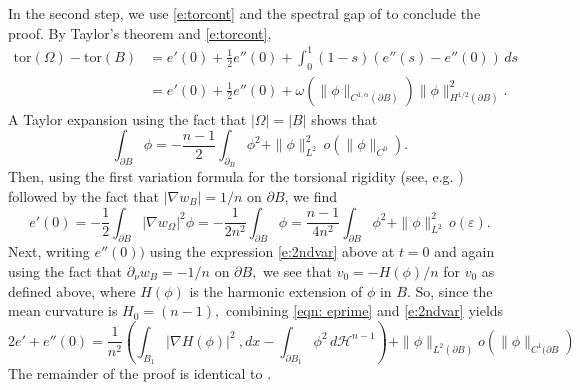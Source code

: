 \documentclass[10pt, reqno]{amsart}
\numberwithin{equation}{section}
\def\e{\varepsilon}
\def\W{\Omega}
\def\tor{\mathrm{tor}}
\def\na{\nabla}
\begin{document}
In the second step, we use \eqref{e:torcont} and the spectral gap of \cite[Theorem 3.3]{BDV15} to conclude the proof. By Taylor's theorem and \eqref{e:torcont},
\begin{align*}
 \tor(\W)-\tor(B) & = e'(0) + \frac{1}{2} e''(0) + \int_0^1 (1-s) (e''(s) - e''(0))\,ds\\
 &= e'(0) + \frac{1}{2} e''(0) + \omega(\| \phi \|_{C^{1,\alpha}(\partial B)}) \| \phi \|^2_{H^{1/2}(\partial B)}. 
\end{align*}
A Taylor expansion using the fact that $|\Omega|=|B|$ shows that 
\[
\int_{\partial B}  \phi   = - \frac{n-1}{2} \int_{\partial_B }\phi^2 + \| \phi \|_{L^2}^2\, o(\| \phi\|_{C^0}).
\]
Then, using the first variation formula for the torsional rigidity (see, e.g. \cite[Lemma 2.7]{dl19}) followed by the fact that $|\na w_B| = 1/n$ on $\partial B$, we find 
\begin{equation}
    \label{eqn: eprime}
e'(0) = -\frac{1}{2}  \int_{\partial B}  |\nabla w_\W|^2 \phi
= -\frac{1}{2n^2}  \int_{\partial B}  \phi = \frac{n-1}{4n^2} \int_{\partial B} \phi^2  + \| \phi \|_{L^2}^2\, o(\e).
\end{equation}
Next, writing $e''(0))$ using the expression \eqref{e:2ndvar} above at $t=0$ and again using the fact that $\partial_\nu w_B= -1/n$ on $\partial B,$ we see that $v_0 = -H(\phi)/n$ for $v_0$ as defined above, where $H(\phi)$ is the harmonic extension of $\phi$ in $B$. So, since the mean curvature is $H_0 = (n-1),$ combining \eqref{eqn: eprime} and \eqref{e:2ndvar} yields
\[
2e' + e''(0) = 
\frac{1}{n^2}\left( \int_{B_1} |\na H(\phi)|^2\ ,dx - \int_{\partial B_1} \phi^2 \, d\mathcal{H}^{n-1}\right) + \|\phi\|_{L^2(\partial B)} o(\| \phi\|_{C^1(\partial B})
\]
The remainder of the proof is identical to \cite[Theorem 3.3]{BDV15}.





\end{document}
